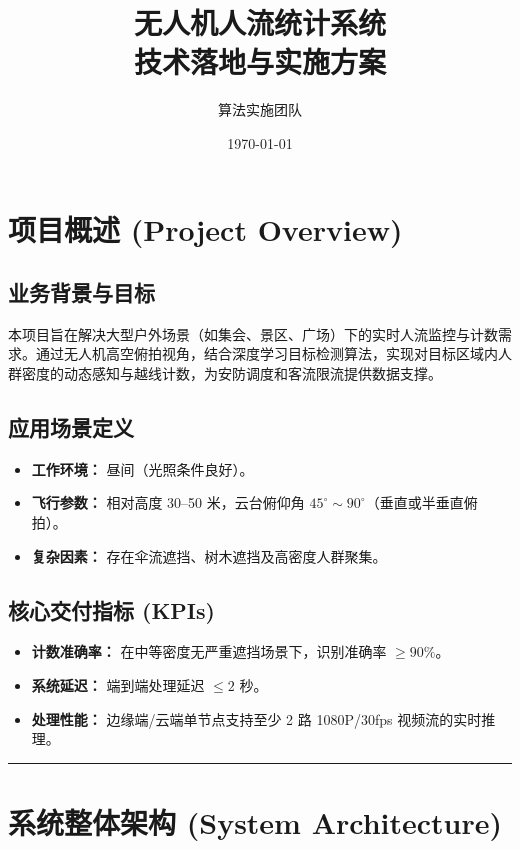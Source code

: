 \documentclass[a4paper, 11pt, fontset=fandol]{ctexart}
\title{\textbf{无人机人流统计系统\\技术落地与实施方案}}
\author{算法实施团队}
\date{\today}
\begin{document}
\maketitle
\thispagestyle{empty}
\newpage

\setcounter{page}{1}

\section{项目概述 (Project Overview)}

\subsection{业务背景与目标}
本项目旨在解决大型户外场景（如集会、景区、广场）下的实时人流监控与计数需求。通过无人机高空俯拍视角，结合深度学习目标检测算法，实现对目标区域内人群密度的动态感知与越线计数，为安防调度和客流限流提供数据支撑。

\subsection{应用场景定义}
\begin{itemize}[label=\textbullet]
    \item \textbf{工作环境：} 昼间（光照条件良好）。
    \item \textbf{飞行参数：} 相对高度 30--50 米，云台俯仰角 $45^\circ \sim 90^\circ$（垂直或半垂直俯拍）。
    \item \textbf{复杂因素：} 存在伞流遮挡、树木遮挡及高密度人群聚集。
\end{itemize}

\subsection{核心交付指标 (KPIs)}
\begin{itemize}[label=\textbullet]
    \item \textbf{计数准确率：} 在中等密度无严重遮挡场景下，识别准确率 $\ge 90\%$。
    \item \textbf{系统延迟：} 端到端处理延迟 $\le 2$ 秒。
    \item \textbf{处理性能：} 边缘端/云端单节点支持至少 2 路 1080P/30fps 视频流的实时推理。
\end{itemize}

\vspace{1em}
\hrule
\vspace{1em}

\section{系统整体架构 (System Architecture)}
\end{document}
